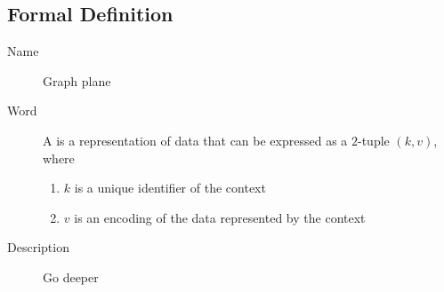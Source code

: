 
\subsection{Formal Definition}

\begin{description}
    \item[Name] Graph plane \vspace{2mm}
    \item[Word] \begin{definition}[action]
              A \textbf{} is a representation of data that can be expressed as a $2$-tuple $(k,v)$, where
              \begin{enumerate}
                  \item $k$ is a unique identifier of the context
                  \item $v$ is an encoding of the data represented by the context
              \end{enumerate}
          \end{definition}
    \item[Description] Go deeper
\end{description}
